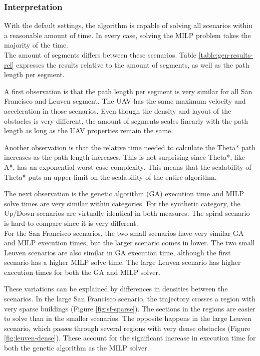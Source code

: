 \subsubsection{Interpretation}
With the default settings, the algorithm is capable of solving all scenarios within a reasonable amount of time. In every case, solving the MILP problem takes the majority of the time. \\
The amount of segments differs between these scenarios. Table \ref{table:gen-results-rel} expresses the results relative to the amount of segments, as well as the path length per segment.
\par
A first observation is that the path length per segment is very similar for all San Francisco and Leuven segment. The UAV has the same maximum velocity and acceleration in those scenarios. Even though the density and layout of the obstacles is very different, the amount of segments scales linearly with the path length as long as the UAV properties remain the same.
\par
Another observation is that the relative time needed to calculate the Theta* path increases as the path length increases. This is not surprising since Theta*, like A*, has an exponential worst-case complexity. This means that the scalability of Theta* puts an upper limit on the scalability of the entire algorithm.
\par
The next observation is the genetic algorithm (GA) execution time and MILP solve times are very similar within categories. For the synthetic category, the Up/Down scenarios are virtually identical in both measures. The spiral scenario is hard to compare since it is very different.  \\
For the San Francisco scenarios, the two small scenarios have very similar GA and MILP execution times, but the larger scenario comes in lower. The two small Leuven scenarios are also similar in GA execution time, although the first scenario has a higher MILP solve time. The large Leuven scenario has higher execution times for both the GA and MILP solver.
\par
These variations can be explained by differences in densities between the scenarios. In the large San Francisco scenario, the trajectory crosses a region with very sparse buildings (Figure \ref{fig:sf-sparse}). The sections in the regions are easier to solve than in the smaller scenarios. The opposite happens in the large Leuven scenario, which passes through several regions with very dense obstacles (Figure \ref{fig:leuven-dense}). These account for the significant increase in execution time for both the genetic algorithm as the MILP solver.


